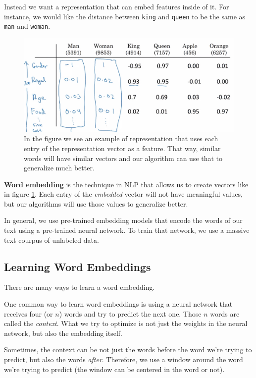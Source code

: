 \documentclass[12pt, a4paper, oneside]{book}
\begin{document}
Instead we want a representation that can embed features inside of it. For
instance, we would like the distance between \texttt{king} and \texttt{queen} to
be the same as \texttt{man} and \texttt{woman}.

\begin{figure}[h]
\centering
\includegraphics[scale=0.4]{Res/word_embedding.jpg}
\caption{In the figure we see an example of representation that uses each entry
of the representation vector as a feature. That way, similar words will have
similar vectors and our algorithm can use that to generalize much better.}
\label{word_embedding.jpg}
\end{figure}

\textbf{Word embedding} is the technique in NLP that allows us to create vectors
like in figure \ref{word_embedding.jpg}. Each entry of the \textit{embedded}
vector will not have meaningful values, but our algorithms will use those values
to generalize better.

In general, we use pre-trained embedding models that encode the words of our
text using a pre-trained neural network. To train that network, we use a massive
text courpus of unlabeled data.

\subsection{Learning Word Embeddings}%
\label{sub:learning_word_embeddings}

There are many ways to learn a word embedding.

One common way to learn word embeddings is using a neural network that receives
four (or $n$) words and try to predict the next one. Those $n$ words are called
the \textit{context}. What we try to optimize is not just the weights in the
neural network, but also the embedding itself.

Sometimes, the context can be not just the words before the word we're trying to
predict, but also the words \textit{after}. Therefore, we use a window around
the word we're trying to predict (the window can be centered in the word or
not).
\end{document}
